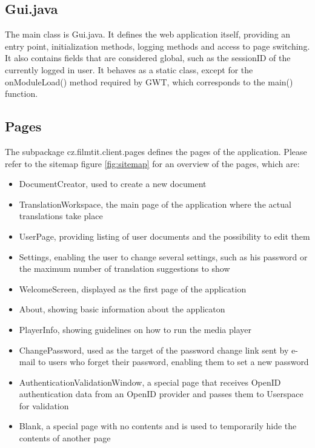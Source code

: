 
\subsection{Gui.java}

The main class is Gui.java. It defines the web application itself, providing an entry point, initialization methods, logging methods and access to page switching. It also contains fields that are considered global, such as the sessionID of the currently logged in user.
It behaves as a static class, except for the onModuleLoad() method required by GWT, which corresponds to the main() function.

\subsection{Pages}

The subpackage cz.filmtit.client.pages defines the pages of the application.
Please refer to the sitemap figure \ref{fig:sitemap} for an overview of the pages, which are:

\begin{itemize}
\item DocumentCreator, used to create a new document
\item TranslationWorkspace, the main page of the application where the actual translations take place
\item UserPage, providing listing of user documents and the possibility to edit them
\item Settings, enabling the user to change several settings, such as his password or the maximum number of translation suggestions to show
\item WelcomeScreen, displayed as the first page of the application
\item About, showing basic information about the applicaton
\item PlayerInfo, showing guidelines on how to run the media player
\item ChangePassword, used as the target of the password change link sent by e-mail to users who forget their password, enabling them to set a new password
\item AuthenticationValidationWindow, a special page that receives OpenID authentication data from an OpenID provider and passes them to Userspace for validation
\item Blank, a special page with no contents and is used to temporarily hide the contents of another page
\end{itemize}

